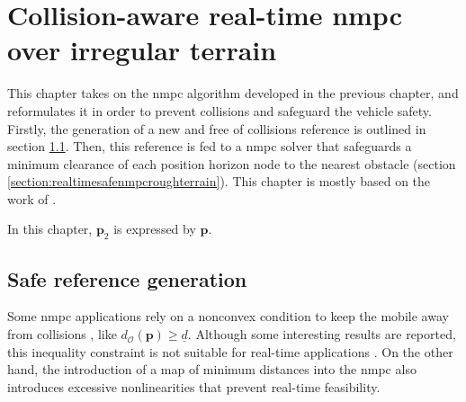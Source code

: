 
\chapter{Collision-aware real-time \acrshort{nmpc} over irregular terrain}
\label{chapter:obstacleAvoidance}

This chapter takes on the \acrshort{nmpc} algorithm developed in the previous chapter, and reformulates it in order to prevent collisions and safeguard the vehicle safety. Firstly, the generation of a new and free of collisions reference is outlined in section \ref{section:saferefgen}. Then, this reference is fed to a \acrshort{nmpc} solver that safeguards a minimum clearance of each position horizon node to the nearest obstacle (section \ref{section:realtimesafenmpcroughterrain}). This chapter is mostly based on the work of \citet{schoels2020ciao, schoels2020nmpc}.

\begin{remark}
In this chapter, $\mathbf{p}_2$ is expressed by $\mathbf{p}$. 
\end{remark}

\section{Safe reference generation}
\label{section:saferefgen}

Some \acrshort{nmpc} applications rely on a nonconvex condition to keep the mobile away from collisions \cite{mpc_frenetserret}, like $d_\mathcal{O}\left(\mathbf{p}\right) \geq \underline{d}$. Although some interesting results are reported, this inequality constraint is not suitable for real-time applications \cite{schoels2020ciao}. On the other hand, the introduction of a map of minimum distances into the \acrshort{nmpc} also introduces excessive nonlinearities that prevent real-time feasibility.

